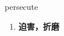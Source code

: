 
\begin{frame}
{\huge persecute}
\begin{center}
\begin{enumerate}\Large
  \item \textbf{迫害，折磨}
\end{enumerate}
\end{center}
\end{frame}
